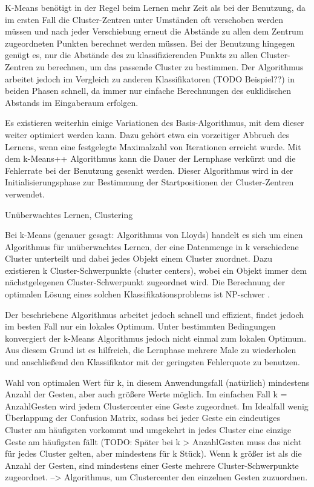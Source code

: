 K-Means benötigt in der Regel beim Lernen mehr Zeit als bei der Benutzung, da im ersten Fall die Cluster-Zentren unter Umständen oft verschoben werden müssen und nach jeder Verschiebung erneut die Abstände zu allen dem Zentrum zugeordneten Punkten berechnet werden müssen. Bei der Benutzung hingegen genügt es, nur die Abstände des zu klassifizierenden Punkts zu allen Cluster-Zentren zu berechnen, um das passende Cluster zu bestimmen. Der Algorithmus arbeitet jedoch im Vergleich zu anderen Klassifikatoren (TODO Beispiel??) in beiden Phasen schnell, da immer nur einfache Berechnungen des euklidischen Abstands im Eingaberaum erfolgen.

Es existieren weiterhin einige Variationen des Basis-Algorithmus, mit dem dieser weiter optimiert werden kann. Dazu gehört etwa ein vorzeitiger Abbruch des Lernens, wenn eine festgelegte Maximalzahl von Iterationen erreicht wurde. Mit dem k-Means++ Algorithmus \cite{kMeans++} kann die Dauer der Lernphase verkürzt und die Fehlerrate bei der Benutzung gesenkt werden. Dieser Algorithmus wird in der Initialisierungsphase zur Bestimmung der Startpositionen der Cluster-Zentren verwendet. 


Unüberwachtes Lernen, Clustering 

Bei k-Means (genauer gesagt: Algorithmus von Lloyds) handelt es sich um einen Algorithmus für unüberwachtes Lernen, der eine Datenmenge in k verschiedene Cluster unterteilt und dabei jedes Objekt einem Cluster zuordnet. Dazu existieren k Cluster-Schwerpunkte (cluster centers), wobei ein Objekt immer dem nächstgelegenen Cluster-Schwerpunkt zugeordnet wird.
Die Berechnung der optimalen Lösung eines solchen Klassifikationsproblems ist NP-schwer \cite{kMeansNPhard}. 

Der beschriebene Algorithmus arbeitet jedoch schnell und effizient, findet jedoch im besten Fall nur ein lokales Optimum. Unter bestimmten Bedingungen konvergiert der k-Means Algorithmus jedoch nicht einmal zum lokalen Optimum\cite{kMeansMinimum}. Aus diesem Grund ist es hilfreich, die Lernphase mehrere Male zu wiederholen und anschließend den Klassifikator mit der geringsten Fehlerquote zu benutzen.  

Wahl von optimalen Wert für k, in diesem Anwendungsfall (natürlich) mindestens Anzahl der Gesten, aber auch größere Werte möglich. Im einfachen Fall k = AnzahlGesten wird jedem Clustercenter eine Geste zugeordnet. Im Idealfall wenig Überlappung der Confusion Matrix, sodass bei jeder Geste ein eindeutiges Cluster am häufigsten vorkommt und umgekehrt in jedes Cluster eine einzige Geste am häufigsten fällt (TODO: Später bei k > AnzahlGesten muss das nicht für jedes Cluster gelten, aber mindestens für k Stück). Wenn k größer ist als die Anzahl der Gesten, sind mindestens einer Geste mehrere Cluster-Schwerpunkte zugeordnet. --> Algorithmus, um Clustercenter den einzelnen Gesten zuzuordnen. 

